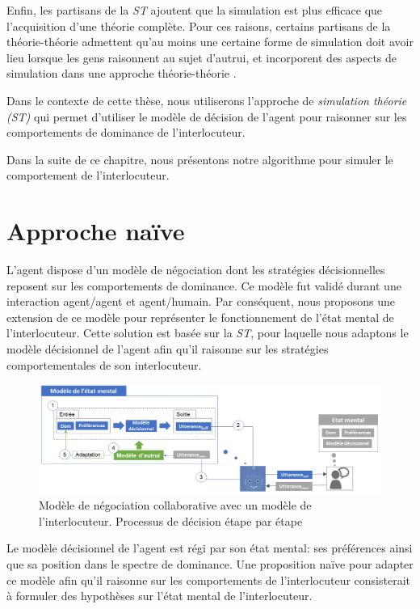 Enfin, les partisans de la \emph{ST} ajoutent que la simulation est plus efficace que l'acquisition d'une théorie complète. Pour ces raisons, certains partisans de la théorie-théorie admettent qu'au moins une certaine forme de simulation doit avoir lieu lorsque les gens raisonnent au sujet d'autrui, et incorporent des aspects de simulation dans une approche théorie-théorie \cite{harbers2012modeling}.

Dans le contexte de cette thèse, nous utiliserons l'approche de \emph{simulation théorie (ST)} qui permet d'utiliser le modèle de décision de l'agent pour raisonner sur les comportements de dominance de l'interlocuteur. 

Dans la suite de ce chapitre, nous présentons notre algorithme pour simuler le comportement de l'interlocuteur.


\section{Approche naïve}
L'agent dispose d'un modèle de négociation dont les stratégies décisionnelles reposent sur les comportements de dominance. Ce modèle fut validé durant une interaction agent/agent et agent/humain. Par conséquent, nous proposons une extension de ce modèle pour représenter le fonctionnement de l'état mental de l'interlocuteur. Cette solution est basée sur la \emph{ST}, pour laquelle nous adaptons le modèle décisionnel de l'agent afin qu'il raisonne sur les stratégies comportementales de son interlocuteur. 

\begin{figure}
	\centering
	\includegraphics[width=\linewidth, height=0.35\textheight]{Figures/chap5/model/general.png}
	\caption{Modèle de négociation collaborative avec un modèle de l'interlocuteur. Processus de décision étape par étape} 
	\label{fig:schema-general}
\end{figure}
	



Le modèle décisionnel de l'agent est régi par son état mental: ses préférences ainsi que sa position dans le spectre de dominance. Une proposition naïve pour adapter ce modèle afin qu'il raisonne sur les comportements de l'interlocuteur consisterait à formuler des hypothèses sur l'état mental de l'interlocuteur. 


